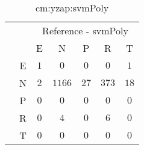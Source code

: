 \begin{table}[!ht]
	\centering
	\begin{tabular}{|c|c|c|c|c|c|c|}
		\cline{3-7}
		\multicolumn{2}{c|}{} & \multicolumn{5}{|c|}{Reference - svmPoly} \\ \cline{3-7}
		\multicolumn{2}{c|}{} & E & N & P & R & T \\ \hline
		\multirow{5}{*}{\rotatebox{90}{Prediction}} & E & $1$ & $0$ & $0$ & $0$ & $1$ \\ \cline{2-7}
		 & N & $2$ & $1166$ & $27$ & $373$ & $18$ \\ \cline{2-7}
		 & P & $0$ & $0$ & $0$ & $0$ & $0$ \\ \cline{2-7}
		 & R & $0$ & $4$ & $0$ & $6$ & $0$ \\ \cline{2-7}
		 & T & $0$ & $0$ & $0$ & $0$ & $0$ \\ \hline
	\end{tabular}
	\caption{cm:yzap:svmPoly}
	\label{tab:cm:yzap:svmPoly}
\end{table}
